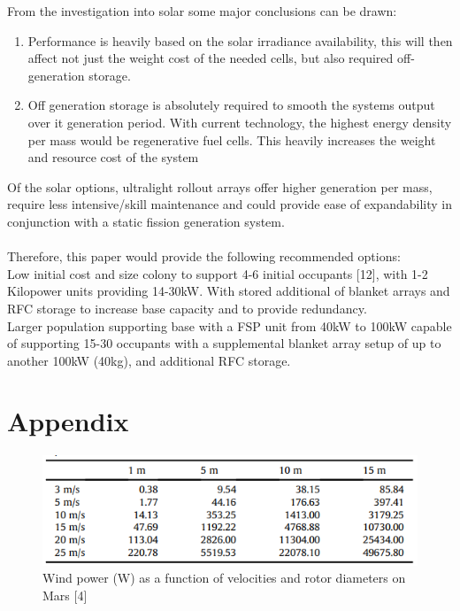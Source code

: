 \documentclass[12pt]{IEEEtran}
\begin{document}
From the investigation into solar some major conclusions can be drawn:
\begin{enumerate}
	\item Performance is heavily based on the solar irradiance availability, this will then affect not just the weight cost of the needed cells, but also required off-generation storage.
	\item Off generation storage is absolutely required to smooth the systems output over it generation period. With current technology, the highest energy density per mass would be regenerative fuel cells. This heavily increases the weight and resource cost of the system
\end{enumerate}

Of the solar options, ultralight rollout arrays offer higher generation per mass, require less intensive/skill maintenance and could provide ease of expandability in conjunction with a static fission generation system.
\\ \\
Therefore, this paper would provide the following recommended options:
\\ Low initial cost and size colony to support 4-6 initial occupants [12], with 1-2 Kilopower units providing 14-30kW. With stored additional of blanket arrays and RFC storage to increase base capacity and to provide redundancy.
\\
Larger population supporting base with a FSP unit from 40kW to 100kW capable of supporting 15-30 occupants with a supplemental blanket array setup of up to another 100kW (40kg), and additional RFC storage.
\clearpage
\section*{Appendix}
\begin{figure}[h]
	\includegraphics[width=\linewidth]{marswind}
	\caption{Wind power (W) as a function of velocities and rotor diameters on Mars {[4]}}
\end{figure}

\nocite{*}


\end{document}
